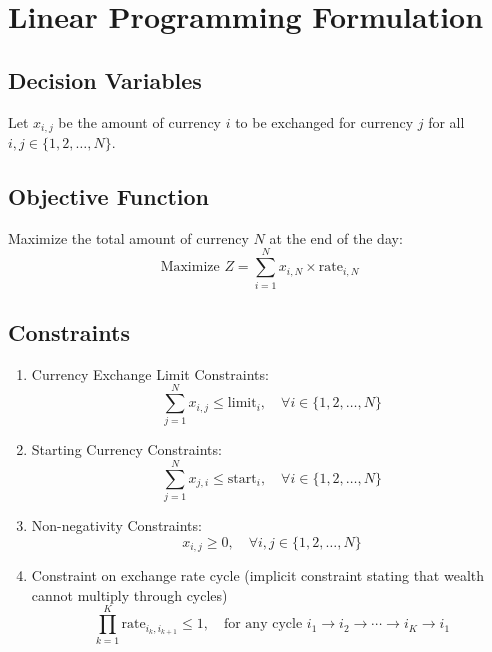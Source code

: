 \documentclass{article}
\begin{document}
\section*{Linear Programming Formulation}

\subsection*{Decision Variables}
Let \( x_{i,j} \) be the amount of currency \( i \) to be exchanged for currency \( j \) for all \( i, j \in \{1, 2, \ldots, N\} \).

\subsection*{Objective Function}
Maximize the total amount of currency \( N \) at the end of the day:
\[
\text{Maximize } Z = \sum_{i=1}^{N} x_{i,N} \times \text{rate}_{i,N}
\]

\subsection*{Constraints}
\begin{enumerate}
    \item Currency Exchange Limit Constraints:
    \[
    \sum_{j=1}^{N} x_{i,j} \leq \text{limit}_i, \quad \forall i \in \{1, 2, \ldots, N\}
    \]

    \item Starting Currency Constraints:
    \[
    \sum_{j=1}^{N} x_{j,i} \leq \text{start}_i, \quad \forall i \in \{1, 2, \ldots, N\}
    \]

    \item Non-negativity Constraints:
    \[
    x_{i,j} \geq 0, \quad \forall i, j \in \{1, 2, \ldots, N\}
    \]

    \item Constraint on exchange rate cycle (implicit constraint stating that wealth cannot multiply through cycles)
    \[
    \prod_{k=1}^{K} \text{rate}_{i_k, i_{k+1}} \leq 1, \quad \text{for any cycle } i_1 \rightarrow i_2 \rightarrow \cdots \rightarrow i_K \rightarrow i_1
    \]
\end{enumerate}
\end{document}
